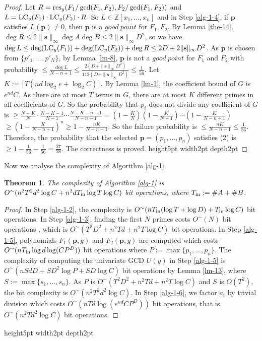 \documentclass[final,20pt]{elsarticle}
\newtheorem{theorem}{Theorem}[section]
\def\Z{{\mathbb Z}}
\def\inp{{\rm{in}}}
\def\res{\hbox{\rm{res}}}
\def\LC{\hbox{\rm{LC}}}
\def\qed{\hfil {\vrule height5pt width2pt depth2pt}}
\begin{document}
\begin{proof}
Let $R=\res_{y}(F_1/\gcd(F_1,F_2),F_2/\gcd(F_1,F_2))$
%
and $L=\LC_y(F_1)\cdot \LC_y(F_2)\cdot R.$ So $L \in \Z[x_1,\dots,x_n]$
%
%
and in Step \ref{alg-1-4}, if $\mathbf{p}$ satisfies $L(\mathbf{p})\neq 0$, then $\mathbf{p}$ is a $good\ point$ for $F_1,F_2$.
%
By Lemma \ref{the-14}, $\deg R\leq 2\|\mathbf{s}\|_{\infty}\deg A\deg B\leq 2\|\mathbf{s}\|_{\infty}D^{2}$, so we have $\deg L\leq\deg(\LC_y(F_1))+\deg(\LC_y(F_2))+\deg R\leq 2D+2\|\mathbf{s}\|_{\infty}D^2$.
%
As $\mathbf{p}$ is chosen from $\{p'_1,\dots,p'_N\}$, by Lemma \ref{lm-8},  $\mathbf{p}$ is not a $good\ point$ for $F_1$ and $F_2$ with probability $\leq \frac{\deg L}{N-n+1}\leq \frac{2(D+\|\mathbf{s}\|_{\infty}D^2)}{112(D+\|\mathbf{s}\|_{\infty}D^2)}\leq \frac{1}{56}.$
%
Let $K:=\lceil T(nd\log_2 e+\log_2 C)\rceil$. By Lemma \ref{lm-1}, the coefficient bound of $G$ is $e^{nd}C$. As there are at most $T$ terms in $G$,  there are at most $K$ different primes in all coefficients of $G$. So the probability that $p_i$ does not divide any coefficient of $G$ is $\geq \frac{N-K}{N}\cdot \frac{N-K-1}{N-1}\cdots \frac{N-K-n+1}{N-n+1}=(1-\frac{K}{N})(1-\frac{K}{N-1})\cdots (1-\frac{K}{N-n+1})$$
$$\geq (1-\frac{K}{N-n+1})^n\geq 1-\frac{nK}{N-n+1}.$
%
So the failure probability is $\leq \frac{nK}{N-n+1}\leq \frac{1}{56}$.
%
Therefore, the probability that the selected $\mathbf{p}=(p_1,\dots,p_n)$ satisfies (2) is $\geq 1-\frac{1}{56}-\frac{1}{56}=\frac{27}{28}.$
%
The correctness is proved. \qed
\end{proof}


Now we analyse the complexity of Algorithm \ref{alg-1}.

\begin{theorem}\label{the-7}
The complexity of Algorithm \ref{alg-1} is $O^\sim(n^2T^2d^2\log C+n^2dT_{\inp}\log T\\ \log C)$ bit operations, where $T_{\inp}:=\#A+\#B$.
\end{theorem}

\begin{proof}
In Step \ref{alg-1-2}, the complexity is $O^\sim(nT_{\inp}(\log T+\log D)+T_{\inp}\log C)$ bit operations.
In Step \ref{alg-1-3}, finding the first $N$ primes costs $O^\sim(N)$ bit operations \cite[P.500, Them. 18.10]{GaGer13}, which is $O^\sim(T^2D^2+n^2Td+n^2T\log C)$ bit operations.
%
In Step \ref{alg-1-5}, polynomials $F_1(\mathbf{p},y)$ and $F_2(\mathbf{p},y)$ are computed which costs $O^\sim(nT_{\inp}\log d\log (CP^D))$ bit operations where $P:=\max\{p_1,\dots,p_n\}$. The complexity of computing the univariate GCD $U(y)$ in Step \ref{alg-1-5} is $O^\sim(nSdD+SD^2\log P+SD\log C)$ bit operations by Lemma \ref{lm-13}, where $S:=\max\{s_1,\dots,s_n\}$. As $P$ is $O^\sim(T^2D^2+n^2Td+n^2T\log C)$ and $S$ is $O(T^2)$, the bit complexity is $O^\sim(n^2T^2d^2\log C)$.
%
In Step \ref{alg-1-6}, we factor $a_i$ by trivial division which costs $O^\sim(nTd\log (e^{nd}CP^D))$ bit operations, that is,  $O^\sim(n^2Td^2\log C)$ bit operations.
\end{proof}\qed
\end{document}
